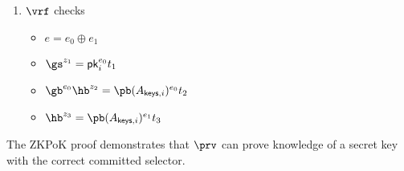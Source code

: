 \begin{Protocol*}[t!]
\begin{mdframed}
\begin{enumerate}
    \item $\vrf$ checks
    \begin{itemize}
        \item $e=e_0\oplus{e_1}$
        \item $\gs^{z_1}=\mathsf{pk}_i^{e_0}t_1$ 
        \item $\gb^{e_0}\hb^{z_2}=\pb(A_{\mathsf{keys},i})^{e_0}t_2$ 
        \item $\hb^{z_3}=\pb(A_{\mathsf{keys},i})^{e_1}t_3$
    \end{itemize} 
\end{enumerate} 
\end{mdframed}
\caption{The ZKPoK proof demonstrates that $\prv$ can prove knowledge of a secret key with the correct committed selector.}\label{alg:zkpok}
\end{Protocol*}
    